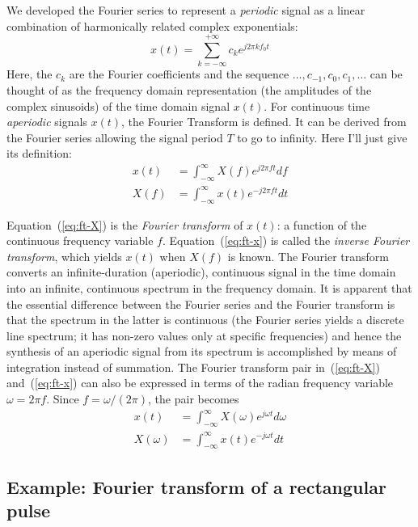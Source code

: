 We developed the Fourier series to represent a \emph{periodic} signal
as a linear combination of harmonically related complex
exponentials:
\begin{equation}
  x(t) = \sum_{k=-\infty}^{+\infty} c_k e^{j2\pi k f_0t}
\end{equation}
Here, the $c_k$ are the Fourier coefficients and the sequence $\ldots,
c_{-1}, c_0, c_1, \ldots$ can be thought of as the frequency domain
representation (the amplitudes of the complex sinusoids) of the time
domain signal $x(t)$.  For continuous time \emph{aperiodic} signals
$x(t)$, the Fourier Transform is defined. It can be derived from the
Fourier series allowing the signal period $T$ to go to infinity.  Here
I'll just give its definition:
\begin{align}
x(t) &= \int_{-\infty}^{\infty}X(f)e^{j2\pi ft}df
\label{eq:ft-x} \\
X(f) &= \int_{-\infty}^{\infty}x(t)e^{-j2\pi ft}dt
\label{eq:ft-X}
\end{align}

Equation~(\ref{eq:ft-X}) is the \emph{Fourier transform} of $x(t)$: a
function of the continuous frequency variable
$f$. Equation~(\ref{eq:ft-x}) is called the \emph{inverse Fourier
  transform}, which yields $x(t)$ when $X(f)$ is known. The Fourier
transform converts an infinite-duration (aperiodic), continuous signal
in the time domain into an infinite, continuous spectrum in the
frequency domain. It is apparent that the essential difference between
the Fourier series and the Fourier transform is that the spectrum in
the latter is continuous (the Fourier series yields a discrete line
spectrum; it has non-zero values only at specific frequencies) and
hence the synthesis of an aperiodic signal from its spectrum is
accomplished by means of integration instead of summation. The Fourier
transform pair in~(\ref{eq:ft-X}) and~(\ref{eq:ft-x}) can also be
expressed in terms of the radian frequency variable $\omega = 2\pi
f$. Since $f = \omega/(2\pi)$, the pair becomes
\begin{align}
x(t) &= \int_{-\infty}^{\infty}X(\omega)e^{j\omega t}d\omega\\
X(\omega) &= \int_{-\infty}^{\infty}x(t)e^{-j\omega t}dt
\end{align}

\subsection{Example: Fourier transform of a rectangular pulse}

